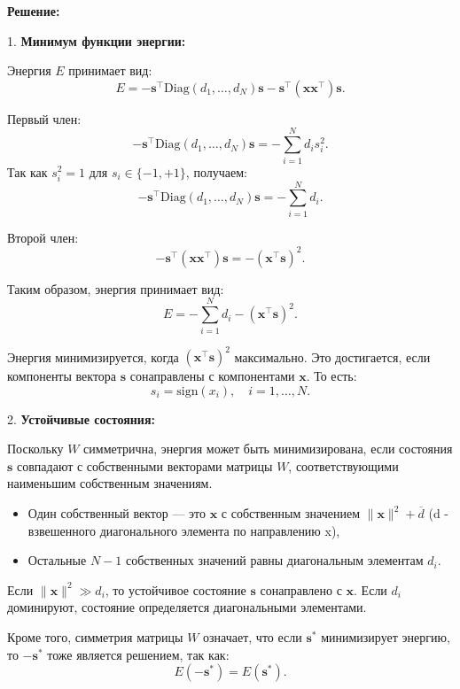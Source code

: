 \begin{description}
	      \textbf{Решение:}

	      1. \textbf{Минимум функции энергии:}

	      Энергия \( E \) принимает вид:
	      \[
		      E = -\mathbf{s}^\top \text{Diag}(d_1, \dots, d_N) \mathbf{s} - \mathbf{s}^\top (\mathbf{x} \mathbf{x}^\top) \mathbf{s}.
	      \]

	      Первый член:
	      \[
		      -\mathbf{s}^\top \text{Diag}(d_1, \dots, d_N) \mathbf{s} = -\sum_{i=1}^N d_i s_i^2.
	      \]
	      Так как \( s_i^2 = 1 \) для \( s_i \in \{-1, +1\} \), получаем:
	      \[
		      -\mathbf{s}^\top \text{Diag}(d_1, \dots, d_N) \mathbf{s} = -\sum_{i=1}^N d_i.
	      \]

	      Второй член:
	      \[
		      -\mathbf{s}^\top (\mathbf{x} \mathbf{x}^\top) \mathbf{s} = -(\mathbf{x}^\top \mathbf{s})^2.
	      \]

	      Таким образом, энергия принимает вид:
	      \[
		      E = -\sum_{i=1}^N d_i - (\mathbf{x}^\top \mathbf{s})^2.
	      \]

	      Энергия минимизируется, когда \( (\mathbf{x}^\top \mathbf{s})^2 \) максимально. Это достигается, если компоненты вектора \( \mathbf{s} \) сонаправлены с компонентами \( \mathbf{x} \). То есть:
	      \[
		      s_i = \text{sign}(x_i), \quad i = 1, \dots, N.
	      \]

	      2. \textbf{Устойчивые состояния:}

	      Поскольку \( W \) симметрична, энергия может быть минимизирована, если состояния \( \mathbf{s} \) совпадают с собственными векторами матрицы \( W \), соответствующими наименьшим собственным значениям.

	      \begin{itemize}
		      \item Один собственный вектор — это \( \mathbf{x} \) с собственным значением \( \|\mathbf{x}\|^2  + \overline{d}\) (d - взвешенного диагонального элемента по направлению x),
		      \item Остальные \( N-1 \) собственных значений равны диагональным элементам \( d_i \).
	      \end{itemize}

	      Если \( \|\mathbf{x}\|^2 \gg d_i \), то устойчивое состояние \( \mathbf{s} \) сонаправлено с \( \mathbf{x} \). Если \( d_i \) доминируют, состояние определяется диагональными элементами.

	      Кроме того, симметрия матрицы \( W \) означает, что если \( \mathbf{s}^* \) минимизирует энергию, то \( -\mathbf{s}^* \) тоже является решением, так как:
	      \[
		      E(-\mathbf{s}^*) = E(\mathbf{s}^*).
	      \]


\end{description}
